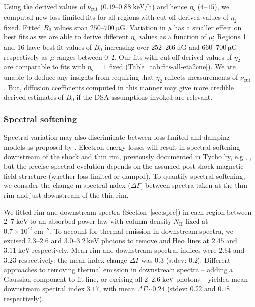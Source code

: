\documentclass[manuscript]{aastex}  %
\newcommand*{\mt}{\mathrm}
\newcommand*{\unit}[1]{\;\mt{#1}}  %
\newcommand*{\abt}{\mathord{\sim}} %
\newcommand*{\muG}{\unit{\mu G}}
\begin{document}
Using the derived values of $\nu_{\mt{cut}}$ ($0.19$--$0.88 \unit{keV/h}$) and
hence $\eta_2$ ($4$--$15$), we computed new loss-limited fits for all regions
with cut-off derived values of $\eta_2$ fixed.  Fitted $B_0$ values span
$250$--$700 \muG$.  Variation in $\mu$ has a smaller effect on best fits as we
are able to derive different $\eta_2$ values as a function of $\mu$; Regions 1
and 16 have best fit values of $B_0$ increasing over $252$--$266 \muG$ and
$660$--$700 \muG$ respectively as $\mu$ ranges between $0$--$2$.  Our fits with
cut-off derived values of $\eta_2$ are comparable to fits with $\eta_2 = 1$
fixed (Table~\ref{tab:fits-all-eta2one}).  We are unable to deduce any insights
from requiring that $\eta_2$ reflects measurements of $\nu_{\mt{cut}}$.  But,
diffusion coefficients computed in this manner may give more credible derived
estimates of $B_0$ if the DSA assumptions invoked are relevant.

\subsubsection{Spectral softening}

Spectral variation may also discriminate between loss-limited and damping
models as proposed by \citet{rettig2012}.  Electron energy losses will result
in spectral softening downstream of the shock and thin rim, previously
documented in Tycho by, e.g., \citet{cassam-chenai2007}, but the precise
spectral evolution depends on the assumed post-shock magnetic field structure
(whether loss-limited or damped).  To quantify spectral softening, we consider
the change in spectral index ($\Delta \Gamma$) between spectra taken at the
thin rim and just downstream of the thin rim.

We fitted rim and downstream spectra (Section~\ref{sec:spec}) in each region
between $2$--$7 \unit{keV}$ to an absorbed power law with column density
$N_{\mt{H}}$ fixed at $0.7 \times 10^{22} \unit{cm^{-2}}$.  To account for
thermal emission in downstream spectra, we excised $2.3$--$2.6$ and
$3.0$--$3.2 \unit{keV}$ photons to remove  and 
He$\alpha$ lines at $2.45$ and $3.11 \unit{keV}$ respectively.  Mean rim and
downstream spectral indices were $2.94$ and $3.23$ respectively; the mean
index change $\Delta \Gamma$ was $0.3$ (stdev: $0.2$).  Different approaches to
removing thermal emission in downstream spectra -- adding a Gaussian component
to fit  line, or excising all $2$--$2.6 \unit{keV}$ photons --
yielded mean downstream spectral index $3.17$, with mean $\Delta \Gamma \abt
0.24$ (stdev: $0.22$ and $0.18$ respectively).
\end{document}
